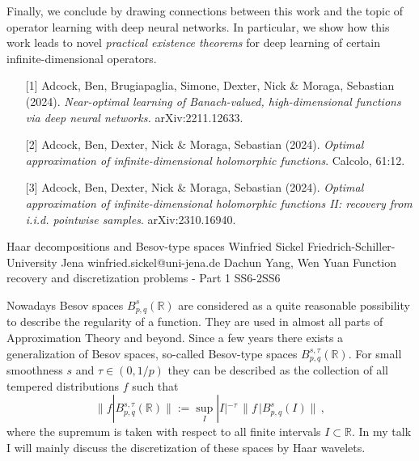 \begin{talk}
Finally, we conclude by drawing connections between this work and the topic of operator learning with deep neural networks. In particular, we show how this work leads to novel \textit{practical existence theorems} for deep learning of certain infinite-dimensional operators.


\medskip

\begin{enumerate}
\item[{[1]}] Adcock, Ben, Brugiapaglia, Simone, Dexter, Nick \& Moraga, Sebastian (2024). 
{\it Near-optimal learning of Banach-valued, high-dimensional functions via deep neural networks.} arXiv:2211.12633.
	\item[{[2]}] Adcock, Ben, Dexter, Nick \& Moraga, Sebastian (2024). {\it Optimal approximation of infinite-dimensional holomorphic functions}. Calcolo, 61:12.
	\item[{[3]}] Adcock, Ben, Dexter, Nick \& Moraga, Sebastian (2024). {\it Optimal approximation of infinite-dimensional holomorphic functions II: recovery from i.i.d. pointwise samples}. arXiv:2310.16940.
\end{enumerate}

\end{talk}

\begin{talk}
  {Haar decompositions and Besov-type spaces}%
  {Winfried Sickel}%
  {Friedrich-Schiller-University Jena }%
  {winfried.sickel@uni-jena.de}%
  {Dachun Yang, Wen Yuan}%
{Function recovery and discretization problems - Part 1}
{}{SS6-2}{SS6}

			
Nowadays Besov spaces $B^s_{p,q} (\mathbb{R})$ are considered as a quite reasonable possibility to describe the regularity of a function. They are used in almost all parts of Approximation Theory and beyond. 
Since a few years there exists a generalization of Besov spaces, so-called Besov-type spaces $B^{s,\tau}_{p,q} (\mathbb{R})$. 
For small smoothness $s$ and $\tau \in (0,1/p)$ they can be described as the collection of all tempered distributions 
$f$ such that
\[
\| f|B^{s,\tau}_{p,q} (\mathbb{R})\| := \sup_{I} |I|^{-\tau} \, \| f\, |B^{s}_{p,q} (I)\|\, , 
\]
where the supremum is taken with respect to all finite intervals $I \subset \mathbb{R}$.
In my talk I will mainly  discuss the discretization of these spaces by Haar wavelets.
 

\end{talk}

